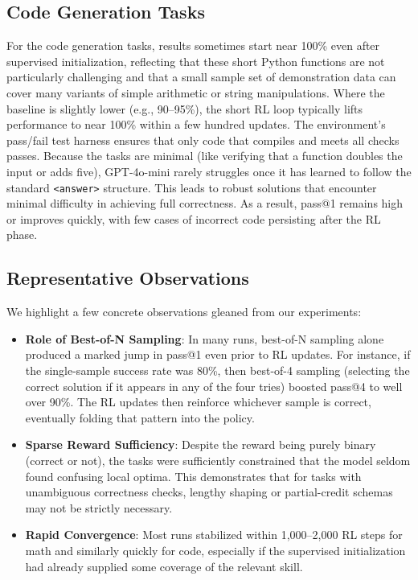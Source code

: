 \documentclass{article}
\begin{document}
\subsection{Code Generation Tasks}
For the code generation tasks, results sometimes start near 100\% even after supervised initialization, reflecting that these short Python functions are not particularly challenging and that a small sample set of demonstration data can cover many variants of simple arithmetic or string manipulations. Where the baseline is slightly lower (e.g., 90–95\%), the short RL loop typically lifts performance to near 100\% within a few hundred updates. The environment’s pass/fail test harness ensures that only code that compiles and meets all checks passes. Because the tasks are minimal (like verifying that a function doubles the input or adds five), GPT-4o-mini rarely struggles once it has learned to follow the standard \texttt{<answer>} structure. This leads to robust solutions that encounter minimal difficulty in achieving full correctness. As a result, pass@1 remains high or improves quickly, with few cases of incorrect code persisting after the RL phase.

\subsection{Representative Observations}
We highlight a few concrete observations gleaned from our experiments:
\begin{itemize}
\item \textbf{Role of Best-of-N Sampling}: In many runs, best-of-N sampling alone produced a marked jump in pass@1 even prior to RL updates. For instance, if the single-sample success rate was 80\%, then best-of-4 sampling (selecting the correct solution if it appears in any of the four tries) boosted pass@4 to well over 90\%. The RL updates then reinforce whichever sample is correct, eventually folding that pattern into the policy.
\item \textbf{Sparse Reward Sufficiency}: Despite the reward being purely binary (correct or not), the tasks were sufficiently constrained that the model seldom found confusing local optima. This demonstrates that for tasks with unambiguous correctness checks, lengthy shaping or partial-credit schemas may not be strictly necessary.
\item \textbf{Rapid Convergence}: Most runs stabilized within 1,000–2,000 RL steps for math and similarly quickly for code, especially if the supervised initialization had already supplied some coverage of the relevant skill.
\end{itemize}
\end{document}
